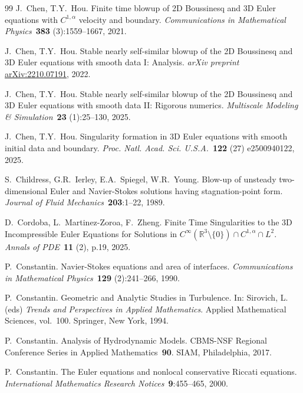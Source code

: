 \documentclass[11pt,reqno]{amsproc}
\numberwithin{equation}{section}
\theoremstyle{remark}
\begin{document}
\begin{thebibliography}{99}
J.~Chen, T.Y.~Hou. 
\newblock Finite time blowup of 2D Boussinesq and 3D Euler equations with $C^{1,\alpha}$ velocity and boundary. 
\newblock \textit{Communications in Mathematical Physics}~\textbf{383} (3):1559--1667, 2021.

J.~Chen, T.Y.~Hou. 
\newblock Stable nearly self-similar blowup of the 2D Boussinesq and 3D Euler equations with smooth data I: Analysis.
\newblock \textit{arXiv preprint} \href{https://arxiv.org/abs/2210.07191}{arXiv:2210.07191}, 2022.

J.~Chen, T.Y.~Hou. 
\newblock Stable nearly self-similar blowup of the 2D Boussinesq and 3D Euler equations with smooth data II: Rigorous numerics.
\newblock \textit{Multiscale Modeling \& Simulation}~\textbf{23} (1):25--130,  2025.

J.~Chen, T.Y.~Hou. 
\newblock Singularity formation in 3D Euler equations with smooth initial data and boundary.
\newblock \textit{Proc. Natl. Acad. Sci. U.S.A.}~\textbf{122} (27) e2500940122, 2025.

S.~Childress, G.R.~Ierley, E.A.~Spiegel, W.R.~Young. 
\newblock Blow-up of unsteady two-dimensional Euler and Navier-Stokes solutions having stagnation-point form. 
\newblock \textit{Journal of Fluid Mechanics}~\textbf{203}:1--22, 1989.

D.~Cordoba, L.~Martinez-Zoroa, F.~Zheng.
\newblock Finite Time Singularities to the 3D Incompressible Euler Equations for Solutions {in $C^\infty(\mathbb{R}^3\setminus\{0\})\cap C^{1,\alpha}\cap L^2$}.
\newblock \textit{Annals of PDE}~\textbf{11} (2), p.19, 2025.

P.~Constantin. 
\newblock Navier-Stokes equations and area of interfaces.
\newblock \textit{Communications in Mathematical Physics}~\textbf{129} (2):241--266, 1990.

 P.~Constantin.
\newblock Geometric and Analytic Studies in Turbulence. 
\newblock In: Sirovich, L. (eds) \textit{Trends and Perspectives in Applied Mathematics}. Applied Mathematical Sciences, vol.~100. Springer, New York, 1994. 

 P.~Constantin. 
\newblock Analysis of Hydrodynamic Models.
\newblock CBMS-NSF Regional Conference Series in Applied Mathematics~\textbf{90}. SIAM, Philadelphia, 2017.

P.~Constantin.
\newblock The Euler equations and nonlocal conservative Riccati equations. 
\newblock \textit{International Mathematics Research Notices}~\textbf{9}:455--465, 2000.


\end{thebibliography}
\end{document}
